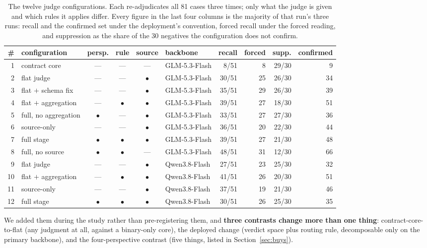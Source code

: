 \documentclass[acmsmall,screen,review,anonymous]{acmart}
\begin{document}
\begin{table}[t]
\caption{The twelve judge configurations. Each re-adjudicates all 81 cases three times; only what
the judge is given and which rules it applies differ. Every figure in the last four columns is the
majority of that run's three runs: recall and the confirmed set under the deployment's convention,
forced recall under the forced reading, and suppression as the share of the 30 negatives the
configuration does not confirm.}
\label{tab:configs}
\footnotesize
\begin{tabular}{@{}rlccclrrrr@{}}
\toprule
\# & configuration & persp. & rule & source & backbone & recall & forced & supp. & confirmed \\
\midrule
1 & contract core & --- & --- & --- & GLM-5.3-Flash & 8/51 & 8 & 29/30 & 9 \\
2 & flat judge & --- & --- & $\bullet$ & GLM-5.3-Flash & 30/51 & 25 & 26/30 & 34 \\
3 & flat $+$ schema fix & --- & --- & $\bullet$ & GLM-5.3-Flash & 35/51 & 29 & 26/30 & 39 \\
4 & flat $+$ aggregation & --- & $\bullet$ & $\bullet$ & GLM-5.3-Flash & 39/51 & 27 & 18/30 & 51 \\
5 & full, no aggregation & $\bullet$ & --- & $\bullet$ & GLM-5.3-Flash & 33/51 & 27 & 27/30 & 36 \\
6 & source-only & --- & --- & $\bullet$ & GLM-5.3-Flash & 36/51 & 20 & 22/30 & 44 \\
7 & full stage & $\bullet$ & $\bullet$ & $\bullet$ & GLM-5.3-Flash & 39/51 & 27 & 21/30 & 48 \\
8 & full, no source & $\bullet$ & $\bullet$ & --- & GLM-5.3-Flash & 48/51 & 31 & 12/30 & 66 \\
9 & flat judge & --- & --- & $\bullet$ & Qwen3.8-Flash & 27/51 & 23 & 25/30 & 32 \\
10 & flat $+$ aggregation & --- & $\bullet$ & $\bullet$ & Qwen3.8-Flash & 41/51 & 26 & 20/30 & 51 \\
11 & source-only & --- & --- & $\bullet$ & Qwen3.8-Flash & 37/51 & 19 & 21/30 & 46 \\
12 & full stage & $\bullet$ & $\bullet$ & $\bullet$ & Qwen3.8-Flash & 30/51 & 26 & 25/30 & 35 \\
\bottomrule
\end{tabular}
\end{table}

We added them during the study rather than pre-registering them, and \textbf{three contrasts change
more than one thing}: contract-core-to-flat (any judgment at all, against a binary-only core), the
deployed change (verdict space plus routing rule, decomposable only on the primary backbone), and
the four-perspective contrast (five things, listed in Section~\ref{sec:buys}).
\end{document}
